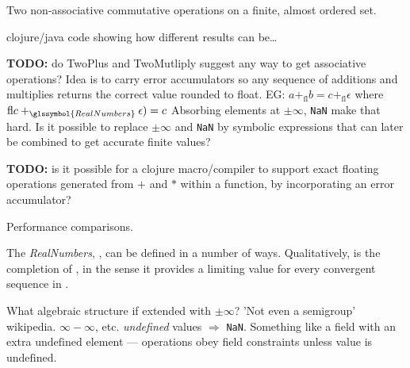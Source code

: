 Two non-associative commutative operations on a finite,
almost ordered set.
\begin{example}

clojure/java code showing how different results can be\ldots
 
\end{example}

\cite{Higham2002ASNA,Muller-et-al-2010,Zhu:2010:A9O:1824801.1824815}

\textbf{TODO:} do TwoPlus and TwoMutliply 
suggest any way to get associative operations?
Idea is to carry error accumulators so 
any sequence of additions and multiplies 
returns the correct  value rounded to float.
EG: $ a +_{\text{fl}} b = c +_{\text{fl}} \epsilon$
where $\text{fl} c +_{\glssymbol{RealNumbers}} \epsilon) = c$
Absorbing elements at $\pm\infty$, \texttt{NaN} make that hard.
Is it possible to replace $\pm\infty$ and \texttt{NaN}
by symbolic expressions that can later be combined to get 
accurate finite values?


\textbf{TODO:} is it possible for a clojure macro/compiler
to support exact floating operations generated from
$+$ and $*$ within a function, by incorporating an error
accumulator?
\label{sec:BigFraction}

Performance comparisons.

\label{sec:Real-numbers}

The \textit{\gls{RealNumbers}}, ,
can be defined in a number of ways. 
Qualitatively,  is the completion of
, 
in the sense it provides a limiting value for every
convergent sequence in .

What algebraic structure if extended with $\pm\infty$?
'Not even a semigroup' wikipedia.
$\infty - \infty$, etc. \textit{undefined} values $\Rightarrow$
\texttt{NaN}.
Something like a field with an extra $\text{undefined}$
element --- operations obey field constraints unless value is
$\text{undefined}$.

